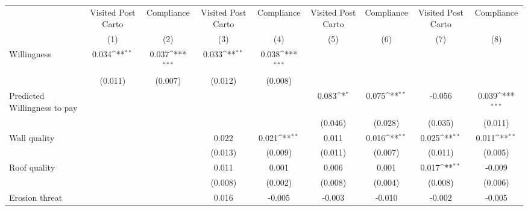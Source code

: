 {
\def\sym#1{\ifmmode^{#1}\else\(^{#1}\)\fi}
\begin{tabular}{l*{8}{c}}
\toprule
                &\multicolumn{1}{c}{Visited Post Carto}&\multicolumn{1}{c}{Compliance}&\multicolumn{1}{c}{Visited Post Carto}&\multicolumn{1}{c}{Compliance}&\multicolumn{1}{c}{Visited Post Carto}&\multicolumn{1}{c}{Compliance}&\multicolumn{1}{c}{Visited Post Carto}&\multicolumn{1}{c}{Compliance}\\
                &\multicolumn{1}{c}{(1)}         &\multicolumn{1}{c}{(2)}         &\multicolumn{1}{c}{(3)}         &\multicolumn{1}{c}{(4)}         &\multicolumn{1}{c}{(5)}         &\multicolumn{1}{c}{(6)}         &\multicolumn{1}{c}{(7)}         &\multicolumn{1}{c}{(8)}         \\
\midrule
Willingness     &    0.034\sym{**} &    0.037\sym{***}&    0.033\sym{**} &    0.038\sym{***}&                  &                  &                  &                  \\
                &  (0.011)         &  (0.007)         &  (0.012)         &  (0.008)         &                  &                  &                  &                  \\
Predicted Willingness to pay&                  &                  &                  &                  &    0.083\sym{*}  &    0.075\sym{**} &   -0.056         &    0.039\sym{***}\\
                &                  &                  &                  &                  &  (0.046)         &  (0.028)         &  (0.035)         &  (0.011)         \\
Wall quality    &                  &                  &    0.022         &    0.021\sym{**} &    0.011         &    0.016\sym{**} &    0.025\sym{**} &    0.011\sym{**} \\
                &                  &                  &  (0.013)         &  (0.009)         &  (0.011)         &  (0.007)         &  (0.011)         &  (0.005)         \\
Roof quality    &                  &                  &    0.011         &    0.001         &    0.006         &    0.001         &    0.017\sym{**} &   -0.009         \\
                &                  &                  &  (0.008)         &  (0.002)         &  (0.008)         &  (0.004)         &  (0.008)         &  (0.006)         \\
Erosion threat  &                  &                  &    0.016         &   -0.005         &   -0.003         &   -0.010         &   -0.002         &   -0.005         \\

\end{tabular}}
